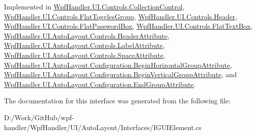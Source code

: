Implemented in \mbox{\hyperlink{class_wpf_handler_1_1_u_i_1_1_controls_1_1_collection_control_a54cf416fee122e600059ed8713d75bb0}{Wpf\+Handler.\+U\+I.\+Controls.\+Collection\+Control}}, \mbox{\hyperlink{class_wpf_handler_1_1_u_i_1_1_controls_1_1_flat_toggles_group_a5619e5107d6cbc3fb2cdabb21deb40a4}{Wpf\+Handler.\+U\+I.\+Controls.\+Flat\+Toggles\+Group}}, \mbox{\hyperlink{class_wpf_handler_1_1_u_i_1_1_controls_1_1_header_a23ac86ea123581ee90d1aa9b6a81dadd}{Wpf\+Handler.\+U\+I.\+Controls.\+Header}}, \mbox{\hyperlink{class_wpf_handler_1_1_u_i_1_1_controls_1_1_flat_password_box_a8a06600a127d2b9bc7a1a04767f383e8}{Wpf\+Handler.\+U\+I.\+Controls.\+Flat\+Password\+Box}}, \mbox{\hyperlink{class_wpf_handler_1_1_u_i_1_1_controls_1_1_flat_text_box_a9885e81c438caeec3448c99796503a71}{Wpf\+Handler.\+U\+I.\+Controls.\+Flat\+Text\+Box}}, \mbox{\hyperlink{class_wpf_handler_1_1_u_i_1_1_auto_layout_1_1_controls_1_1_header_attribute_a837805f9b975447e7cf5663119189c37}{Wpf\+Handler.\+U\+I.\+Auto\+Layout.\+Controls.\+Header\+Attribute}}, \mbox{\hyperlink{class_wpf_handler_1_1_u_i_1_1_auto_layout_1_1_controls_1_1_label_attribute_a70b5b79babc0fd60171ba08231ce2a5c}{Wpf\+Handler.\+U\+I.\+Auto\+Layout.\+Controls.\+Label\+Attribute}}, \mbox{\hyperlink{class_wpf_handler_1_1_u_i_1_1_auto_layout_1_1_controls_1_1_space_attribute_abc4dedcaa52529fb4f0e227fb2386866}{Wpf\+Handler.\+U\+I.\+Auto\+Layout.\+Controls.\+Space\+Attribute}}, \mbox{\hyperlink{class_wpf_handler_1_1_u_i_1_1_auto_layout_1_1_configuration_1_1_begin_horizontal_group_attribute_a8bb61f969389bece86c87fbfa44d4c82}{Wpf\+Handler.\+U\+I.\+Auto\+Layout.\+Configuration.\+Begin\+Horizontal\+Group\+Attribute}}, \mbox{\hyperlink{class_wpf_handler_1_1_u_i_1_1_auto_layout_1_1_configuration_1_1_begin_vertical_group_attribute_a52859bc4d83f107cbae35d20ae97ce83}{Wpf\+Handler.\+U\+I.\+Auto\+Layout.\+Configuration.\+Begin\+Vertical\+Group\+Attribute}}, and \mbox{\hyperlink{class_wpf_handler_1_1_u_i_1_1_auto_layout_1_1_configuration_1_1_end_group_attribute_acaed685d0daf2b14d8f232389d56c478}{Wpf\+Handler.\+U\+I.\+Auto\+Layout.\+Configuration.\+End\+Group\+Attribute}}.



The documentation for this interface was generated from the following file\+:\begin{DoxyCompactItemize}
\item 
D\+:/\+Work/\+Git\+Hub/wpf-\/handler/\+Wpf\+Handler/\+U\+I/\+Auto\+Layout/\+Interfaces/I\+G\+U\+I\+Element.\+cs\end{DoxyCompactItemize}
